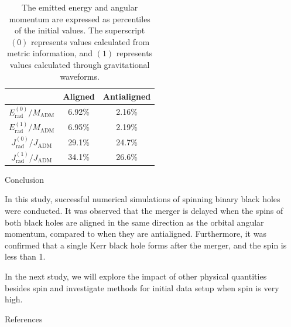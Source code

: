 \documentclass[noamssymb]{beamer}
\newlength{\sepwidth}
\newlength{\colwidth}
\newcommand{\separatorcolumn}{\begin{column}{\sepwidth}\end{column}}
\begin{document}
\begin{frame}[t]
\begin{columns}[t]
\begin{column}{\colwidth}
\begin{block}{}
	\begin{table}
		\centering
		\begin{tabular}{c c c}
			\toprule
			\textbf{} & \textbf{Aligned} & \textbf{Antialigned}\\
			\midrule
			$E_\mathrm{rad}^{(0)}/M_\mathrm{ADM}$ & 6.92\% & 2.16\% \\
			$E_\mathrm{rad}^{(1)}/M_\mathrm{ADM}$ & 6.95\% & 2.19\% \\
			$J_\mathrm{rad}^{(0)}/J_\mathrm{ADM}$ & 29.1\% & 24.7\% \\
			$J_\mathrm{rad}^{(1)}/J_\mathrm{ADM}$ & 34.1\% & 26.6\% \\
			\bottomrule
		\end{tabular}
		\caption{\label{tab:comp} The emitted energy and angular momentum are expressed as percentiles of the initial values. The superscript $(0)$ represents values calculated from metric information, and $(1)$ represents values calculated through gravitational waveforms.}
	\end{table}
	


  \end{block}

  \begin{block}{Conclusion}
	
    In this study, successful numerical simulations of spinning binary black holes were conducted. It was observed that the merger is delayed when the spins of both black holes are aligned in the same direction as the orbital angular momentum, compared to when they are antialigned. Furthermore, it was confirmed that a single Kerr black hole forms after the merger, and the spin is less than 1.
    
    In the next study, we will explore the impact of other physical quantities besides spin and investigate methods for initial data setup when spin is very high.

  \end{block}

  \begin{block}{References}

    \footnotesize{}

  \end{block}

\end{column}

\separatorcolumn
\end{columns}
\end{frame}
\end{document}
